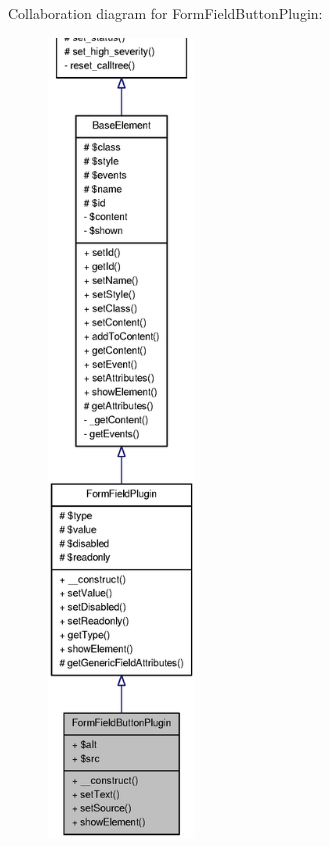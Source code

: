 Collaboration diagram for FormFieldButtonPlugin:\nopagebreak
\begin{figure}[H]
\begin{center}
\leavevmode
\includegraphics[height=600pt]{classFormFieldButtonPlugin__coll__graph}
\end{center}
\end{figure}
